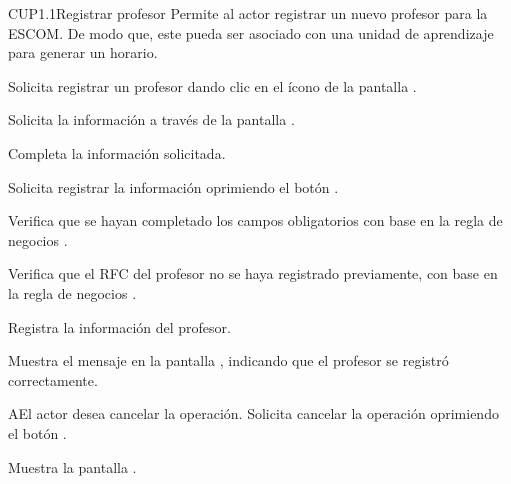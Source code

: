 \begin{UseCase}{CUP1.1}{Registrar profesor}{	
	Permite al actor registrar un nuevo profesor para la ESCOM. De modo que, este pueda ser asociado con una unidad de aprendizaje para generar un horario. 
}
{\begin{UClist}
			\UCli {} 
		\end{UClist}
	}
\end{UseCase}

\begin{UCtrayectoria}
	\UCpaso [\UCactor] Solicita registrar un profesor dando clic en el ícono \btnRegistrar de la pantalla . 
	
	\UCpaso [\UCsist] Solicita la información a través de la pantalla .
	
	\UCpaso [\UCactor] Completa la información solicitada. \label{CUP1.1:CompletaInfo}
	
	\UCpaso [\UCactor] Solicita registrar la información oprimiendo el botón . 
	
	\UCpaso [\UCsist] Verifica que se hayan completado los campos obligatorios con base en la regla de negocios . 
	
	\UCpaso [\UCsist] Verifica que el RFC del profesor no se haya registrado previamente, con base en la regla de negocios . 
	
	\UCpaso [\UCsist] Registra la información del profesor.
	
	\UCpaso [\UCsist] Muestra el mensaje  en la pantalla , indicando que el profesor se registró correctamente.	
	
\end{UCtrayectoria}


\begin{UCtrayectoriaA}{A}{El actor desea cancelar la operación.}
	\UCpaso [\UCactor] Solicita cancelar la operación oprimiendo el botón .
	
	\UCpaso [\UCsist] Muestra la pantalla . 
\end{UCtrayectoriaA}

